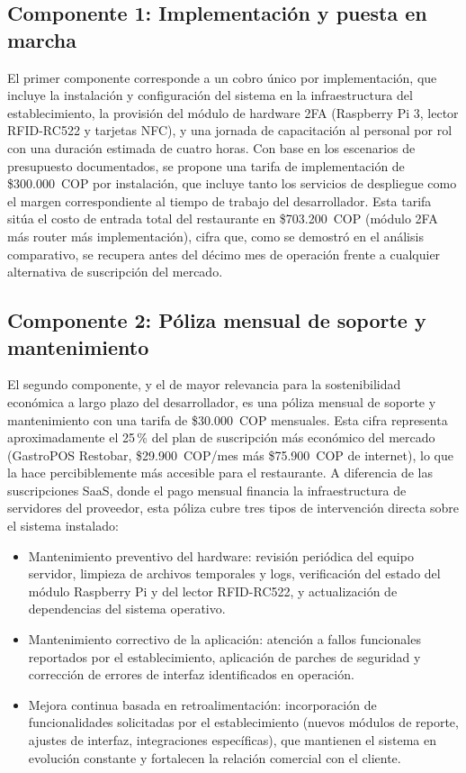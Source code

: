 \subsection*{Componente 1: Implementación y puesta en marcha}

El primer componente corresponde a un cobro único por implementación, que incluye la
instalación y configuración del sistema en la infraestructura del establecimiento, la
provisión del módulo de hardware 2FA (Raspberry Pi 3, lector RFID-RC522 y tarjetas NFC),
y una jornada de capacitación al personal por rol con una duración estimada de cuatro
horas. Con base en los escenarios de presupuesto documentados, se propone una tarifa de
implementación de \$300.000~COP por instalación, que incluye tanto los servicios de
despliegue como el margen correspondiente al tiempo de trabajo del desarrollador. Esta
tarifa sitúa el costo de entrada total del restaurante en \$703.200~COP (módulo 2FA más
router más implementación), cifra que, como se demostró en el análisis comparativo,
se recupera antes del décimo mes de operación frente a cualquier alternativa de
suscripción del mercado.

\subsection*{Componente 2: Póliza mensual de soporte y mantenimiento}

El segundo componente, y el de mayor relevancia para la sostenibilidad económica a largo
plazo del desarrollador, es una póliza mensual de soporte y mantenimiento con una tarifa
de \$30.000~COP mensuales. Esta cifra representa aproximadamente el 25\,\% del plan de
suscripción más económico del mercado (GastroPOS Restobar, \$29.900~COP/mes más
\$75.900~COP de internet), lo que la hace percibiblemente más accesible para el
restaurante. A diferencia de las suscripciones SaaS, donde el pago mensual financia la
infraestructura de servidores del proveedor, esta póliza cubre tres tipos de intervención
directa sobre el sistema instalado:

\begin{itemize}
	\item Mantenimiento preventivo del hardware: revisión periódica del equipo servidor,
	limpieza de archivos temporales y logs, verificación del estado del módulo Raspberry Pi
	y del lector RFID-RC522, y actualización de dependencias del sistema operativo.
	\item Mantenimiento correctivo de la aplicación: atención a fallos funcionales
	reportados por el establecimiento, aplicación de parches de seguridad y corrección
	de errores de interfaz identificados en operación.
	\item Mejora continua basada en retroalimentación: incorporación de funcionalidades
	solicitadas por el establecimiento (nuevos módulos de reporte, ajustes de interfaz,
	integraciones específicas), que mantienen el sistema en evolución constante y
	fortalecen la relación comercial con el cliente.
\end{itemize}

